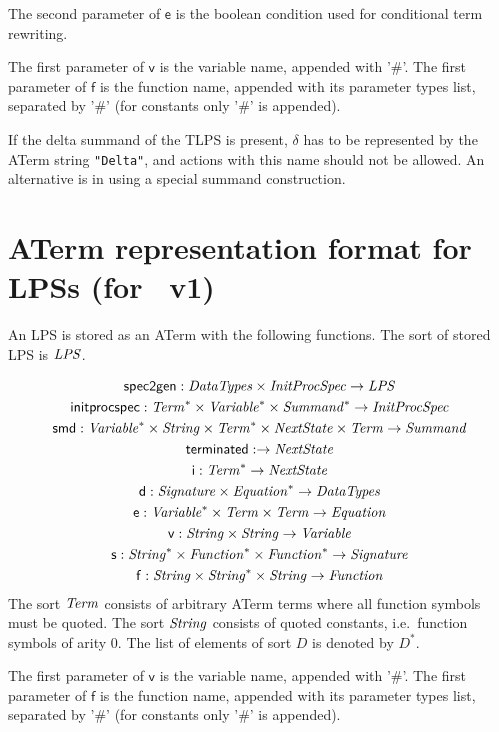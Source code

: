 \documentclass[fleqn,a4paper,dvips]{article}
\newcommand{\aterm}[1]{\mathsf{#1}}
\newcommand{\afunc}[3]{\aterm{#1}:#2\rightarrow#3}
\begin{document}
The second parameter of $\mathsf{e}$ is the boolean condition used for
conditional term rewriting.

The first parameter of $\mathsf{v}$ is the variable name, appended with '\#'.
The first parameter of $\mathsf{f}$ is the function name, appended
with its parameter types list, separated by '\#' (for constants only '\#' is appended).

If the delta summand of the TLPS is present, $\delta$ has to be
represented by the ATerm string \texttt{"Delta"}, and actions with
this name should not be allowed.  An alternative is in using a special
summand construction.

\newpage
\section{ATerm representation format for LPSs (for \mcrl\ v1)}
An LPS is stored as an ATerm with the following functions. The sort
of stored LPS is $\mathit{LPS}$.

\begin{gather*}
\afunc{spec2gen}{\nm{DataTypes}\x\nm{InitProcSpec}}{\nm{LPS}}\\
\afunc{initprocspec}{\nm{Term}^*\x\nm{Variable}^*\x\nm{Summand}^*}{\nm{InitProcSpec}}\\
\afunc{smd}{\nm{Variable}^*\x\nm{String}\x\nm{Term}^*\x\nm{NextState}\x\nm{Term}}{\nm{Summand}}\\
\afunc{terminated}{}{\nm{NextState}}\\
\afunc{i}{\nm{Term}^*}{\nm{NextState}}\\
\afunc{d}{\nm{Signature}\x\nm{Equation}^*}{\nm{DataTypes}}\\
\afunc{e}{\nm{Variable}^*\x\nm{Term}\x\nm{Term}}{\nm{Equation}}\\
\afunc{v}{\nm{String}\x\nm{String}}{\nm{Variable}}\\
\afunc{s}{\nm{String}^*\x\nm{Function}^*\x\nm{Function}^*}{\nm{Signature}}\\
\afunc{f}{\nm{String}\x\nm{String}^{*}\x\nm{String}}{\nm{Function}}
\end{gather*}
The sort $\mathit{Term}$ consists of arbitrary ATerm terms where all function
symbols must be quoted. The sort $\mathit{String}$ consists of quoted constants,
i.e.\ function symbols of arity 0. The list
of elements of sort $D$ is denoted by $D^{*}$.

The first parameter of $\mathsf{v}$ is the variable name, appended with '\#'.
The first parameter of $\mathsf{f}$ is the function name, appended
with its parameter types list, separated by '\#' (for constants only '\#' is appended).
\end{document}
